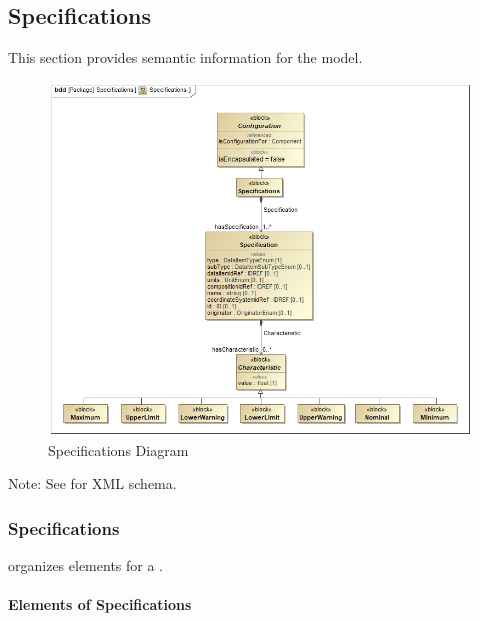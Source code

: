 \subsection{Specifications} \label{sec:Specifications}


This section provides semantic information for the  model.

\begin{figure}[ht]
  \centering
    \includegraphics[width=1.0\textwidth]{figures/Specifications.png}
  \caption{Specifications Diagram}
  \label{fig:Specifications Diagram}
\end{figure}

\FloatBarrier


Note: See  for XML schema.


\subsubsection{Specifications}




 \glspl{organize}  elements for a .


\paragraph{Elements of Specifications}\mbox{}
\label{sec:Elements of Specifications}


